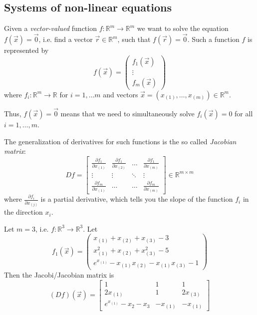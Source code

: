 \subsection{Systems of non-linear equations}
Given a \textit{vector-valued} function $f: \mathbb{R}^m \to \mathbb{R}^m$
we want to solve the equation $f(\vec{x}) = \vec{0}$, i.e.
find a vector $\vec{r} \in \mathbb{R}^m$, such that $f(\vec{r}) = \vec{0}$.
Such a function $f$ is represented by
\[ 
    f(\vec{x}) = \begin{pmatrix}
        f_1(\vec{x}) \\ \vdots \\ f_m(\vec{x})
    \end{pmatrix}
\]
where $f_i : \mathbb{R}^m \to \mathbb{R}$ for $i = 1, \dots m$
and vectors $\vec{x} = (x_{(1)}, \dots, x_{(m)}) \in \mathbb{R}^m$.

Thus, $f(\vec{x}) = \vec{0}$ means that we need to simultaneously
solve $f_i(\vec{x}) = 0$ for all $i = 1, \dots, m$.

The generalization of derivatives for such functions
is the so called \textit{Jacobian matrix}:
\[
    Df = \begin{bmatrix}
        \frac{\partial f_1}{\partial x_{(1)}} & \frac{\partial f_1}{\partial x_{(2)}} & \dots & \frac{\partial f_1}{\partial x_{(m)}}\\
        \vdots & \vdots & \ddots & \vdots\\
        \frac{\partial f_m}{\partial x_{(1)}} & \dots & \dots & \frac{\partial f_m}{\partial x_{(m)}}
    \end{bmatrix} \in \mathbb{R}^{m \times m}
\]
where $\frac{\partial f_i}{\partial x_{(j)}}$ is a partial derivative,
which tells you the slope of the function $f_i$ in the direction $x_i$.

\begin{example}
    Let $m = 3$, i.e. $f : \mathbb{R}^3 \to \mathbb{R}^3$. Let
    \[
        f_1(\vec{x}) = \begin{pmatrix}
            x_{(1)} + x_{(2)} + x_{(3)} - 3\\
            x_{(1)}^2 + x_{(2)} + x_{(3)}^2 - 5\\
            e^{x_{(1)}} - x_{(1)} x_{(2)} - x_{(1)} x_{(3)} - 1
        \end{pmatrix}
    \]
    Then the Jacobi/Jacobian matrix is
    \[
        (Df)(\vec{x}) = \begin{bmatrix}
            1 & 1 & 1\\
            2x_{(1)} & 1 & 2x_{(3)}\\
            e^{x_{(1)}} - x_2 - x_3 & -x_{(1)} & -x_{(1)}
        \end{bmatrix}
    \]
\end{example}

